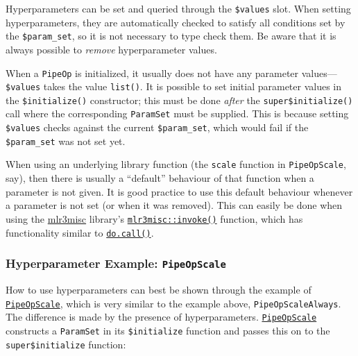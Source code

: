 \documentclass[
]{scrbook}
\newenvironment{Shaded}{\begin{snugshade}}{\end{snugshade}}
\newcommand{\NormalTok}[1]{#1}
\newcommand{\SpecialCharTok}[1]{\textcolor[rgb]{0.00,0.00,0.00}{#1}}
\renewenvironment{Shaded} {\begin{snugshade}\small} {\end{snugshade}}
\begin{document}
Hyperparameters can be set and queried through the \texttt{\$values} slot.
When setting hyperparameters, they are automatically checked to satisfy all conditions set by the \texttt{\$param\_set}, so it is not necessary to type check them.
Be aware that it is always possible to \emph{remove} hyperparameter values.

When a \texttt{PipeOp} is initialized, it usually does not have any parameter values---\texttt{\$values} takes the value \texttt{list()}.
It is possible to set initial parameter values in the \texttt{\$initialize()} constructor; this must be done \emph{after} the \texttt{super\$initialize()} call where the corresponding \texttt{ParamSet} must be supplied.
This is because setting \texttt{\$values} checks against the current \texttt{\$param\_set}, which would fail if the \texttt{\$param\_set} was not set yet.

When using an underlying library function (the \texttt{scale} function in \texttt{PipeOpScale}, say), then there is usually a ``default'' behaviour of that function when a parameter is not given.
It is good practice to use this default behaviour whenever a parameter is not set (or when it was removed).
This can easily be done when using the \href{https://mlr3misc.mlr-org.com}{mlr3misc} library's \href{https://mlr3misc.mlr-org.com/reference/invoke.html}{\texttt{mlr3misc::invoke()}} function, which has functionality similar to \href{https://www.rdocumentation.org/packages/base/topics/do.call}{\texttt{do.call()}}.

\hypertarget{hyperparameter-example-pipeopscale}{%
\subsubsection{\texorpdfstring{Hyperparameter Example: \texttt{PipeOpScale}}{Hyperparameter Example: PipeOpScale}}\label{hyperparameter-example-pipeopscale}}

How to use hyperparameters can best be shown through the example of \href{https://mlr3pipelines.mlr-org.com/reference/mlr_pipeops_scale.html}{\texttt{PipeOpScale}}, which is very similar to the example above, \texttt{PipeOpScaleAlways}.
The difference is made by the presence of hyperparameters.
\href{https://mlr3pipelines.mlr-org.com/reference/mlr_pipeops_scale.html}{\texttt{PipeOpScale}} constructs a \texttt{ParamSet} in its \texttt{\$initialize} function and passes this on to the \texttt{super\$initialize} function:

\begin{Shaded}
\end{Shaded}
\end{document}
